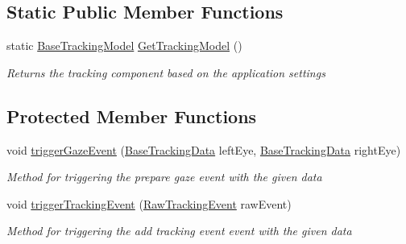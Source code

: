 \subsection*{Static Public Member Functions}
\begin{DoxyCompactItemize}
\item 
static \hyperlink{class_web_analyzer_1_1_models_1_1_base_1_1_base_tracking_model}{Base\+Tracking\+Model} \hyperlink{class_web_analyzer_1_1_models_1_1_base_1_1_base_tracking_model_ae86fbecc03c9d2a2813b684ee2f2c8ee}{Get\+Tracking\+Model} ()
\begin{DoxyCompactList}\small\item\em Returns the tracking component based on the application settings \end{DoxyCompactList}\end{DoxyCompactItemize}
\subsection*{Protected Member Functions}
\begin{DoxyCompactItemize}
\item 
void \hyperlink{class_web_analyzer_1_1_models_1_1_base_1_1_base_tracking_model_a841c667811d9923a91ca7837f72f8f19}{trigger\+Gaze\+Event} (\hyperlink{class_web_analyzer_1_1_models_1_1_base_1_1_base_tracking_data}{Base\+Tracking\+Data} left\+Eye, \hyperlink{class_web_analyzer_1_1_models_1_1_base_1_1_base_tracking_data}{Base\+Tracking\+Data} right\+Eye)
\begin{DoxyCompactList}\small\item\em Method for triggering the prepare gaze event with the given data \end{DoxyCompactList}\item 
void \hyperlink{class_web_analyzer_1_1_models_1_1_base_1_1_base_tracking_model_a497edbc82520c1c9582d2747baa6312f}{trigger\+Tracking\+Event} (\hyperlink{class_web_analyzer_1_1_models_1_1_base_1_1_raw_tracking_event}{Raw\+Tracking\+Event} raw\+Event)
\begin{DoxyCompactList}\small\item\em Method for triggering the add tracking event event with the given data \end{DoxyCompactList}\end{DoxyCompactItemize}
